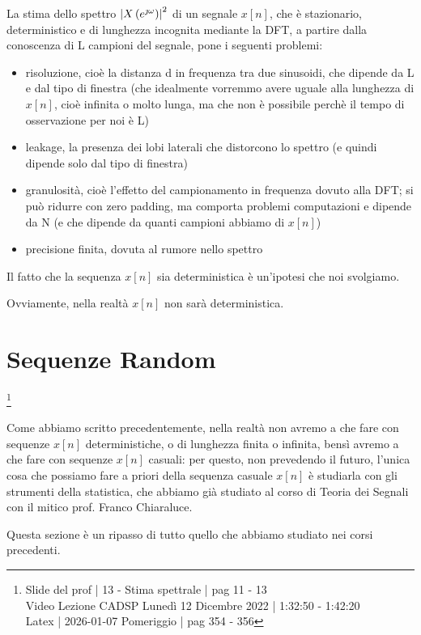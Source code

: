 La stima dello spettro $\abs{X \left(e^{\jmath \omega}\right)}^{2}$ di un segnale $x \left[ n\right]$, che è stazionario, deterministico e di lunghezza incognita mediante la DFT, 
a partire dalla conoscenza di L campioni del segnale, pone i seguenti problemi: 

\begin{itemize}
    \item risoluzione, cioè la distanza d in frequenza tra due sinusoidi, che dipende da L e dal tipo di finestra (che idealmente vorremmo avere uguale alla lunghezza di $x \left[ n\right]$, cioè infinita o molto lunga, ma che non è possibile perchè il tempo di osservazione per noi è L)
    \item leakage, la presenza dei lobi laterali che distorcono lo spettro (e quindi dipende solo dal tipo di finestra)
    \item granulosità, cioè l'effetto del campionamento in frequenza dovuto alla DFT; si può ridurre con zero padding, ma comporta problemi computazioni e dipende da N (e che dipende da quanti campioni abbiamo di $x \left[ n\right]$)
    \item precisione finita, dovuta al rumore nello spettro 
\end{itemize}

\begin{tcolorbox}
Il fatto che la sequenza $x \left[ n\right]$ sia deterministica è un'ipotesi che noi svolgiamo. \newline 

Ovviamente, nella realtà $x \left[ n\right]$ non sarà deterministica. 
\end{tcolorbox}

\newpage 

\section{Sequenze Random}

\footnote{ 
    Slide del prof | 13 - Stima spettrale | pag 11 - 13\\
    Video Lezione CADSP Lunedì 12 Dicembre 2022 | 1:32:50 - 1:42:20 \\
    Latex | 2026-01-07 Pomeriggio | pag 354 - 356 
}

\begin{tcolorbox}
    Come abbiamo scritto precedentemente, nella realtà non avremo a che fare con sequenze $x \left[ n\right]$ deterministiche, o di lunghezza finita o infinita, 
    bensì avremo a che fare con sequenze $x \left[ n\right]$ casuali: per questo, non prevedendo il futuro, l'unica cosa che possiamo fare a priori della sequenza casuale $x \left[ n\right]$ è studiarla con gli strumenti della statistica, 
    che abbiamo già studiato al corso di Teoria dei Segnali con il mitico prof. Franco Chiaraluce. \newline 

    Questa sezione è un ripasso di tutto quello che abbiamo studiato nei corsi precedenti. 
\end{tcolorbox}

